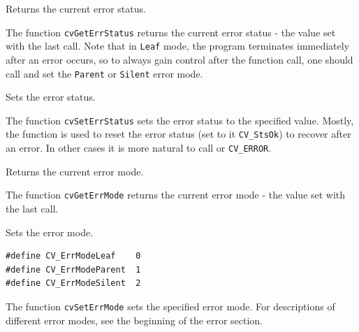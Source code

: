 
\label{GetErrStatus}

Returns the current error status.


The function \texttt{cvGetErrStatus} returns the current error status -
the value set with the last  call. Note that in
\texttt{Leaf} mode, the program terminates immediately after an
error occurs, so to always gain control after the function call,
one should call  and set the \texttt{Parent}
or \texttt{Silent} error mode.

\label{SetErrStatus}

Sets the error status.


\begin{description}
\end{description}

The function \texttt{cvSetErrStatus} sets the error status to the specified value. Mostly, the function is used to reset the error status (set to it \texttt{CV\_StsOk}) to recover after an error. In other cases it is more natural to call  or \texttt{CV\_ERROR}.

\label{GetErrMode}

Returns the current error mode.


The function \texttt{cvGetErrMode} returns the current error mode - the value set with the last  call.

\label{SetErrMode}

Sets the error mode.

\begin{lstlisting}
#define CV_ErrModeLeaf    0
#define CV_ErrModeParent  1
#define CV_ErrModeSilent  2
\end{lstlisting}


\begin{description}
\end{description}

The function \texttt{cvSetErrMode} sets the specified error mode. For descriptions of different error modes, see the beginning of the error section.

